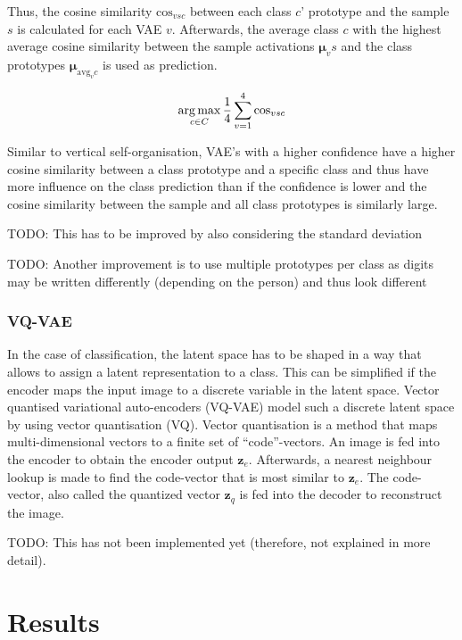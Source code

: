 Thus, the cosine similarity $\text{cos}_{vsc}$ between each class $c$' prototype and the sample $s$ is calculated for each VAE $v$.
Afterwards, the average class $c$ with the highest average cosine similarity between the sample activations $\boldsymbol{\mu}_vs$ and the class prototypes $\boldsymbol{\mu}_{\text{avg}_vc}$ is used as prediction.

\begin{equation}\eqlbl{hso_14}
		\argmax_{c \in C} \frac{1}{4} \sum_{v=1}^{4} \text{cos}_{vsc}
\end{equation}

Similar to vertical self-organisation, VAE's with a higher confidence have a higher cosine similarity between a class prototype and a specific class and thus have more influence on the class prediction than if the confidence is lower and the cosine similarity between the sample and all class prototypes is similarly large.

TODO: This has to be improved by also considering the standard deviation


TODO: Another improvement is to use multiple prototypes per class as digits may be written differently (depending on the person) and thus look different


\subsubsection{VQ-VAE}
In the case of classification, the latent space has to be shaped in a way that allows to assign a latent representation to a class.
This can be simplified if the encoder maps the input image to a discrete variable in the latent space.
Vector quantised variational auto-encoders (VQ-VAE)  model such a discrete latent space by using vector quantisation (VQ).
Vector quantisation is a method that maps multi-dimensional vectors to a finite set of ``code''-vectors.
An image is fed into the encoder to obtain the encoder output $\boldsymbol{z}_e$.
Afterwards, a nearest neighbour lookup is made to find the code-vector that is most similar to $\boldsymbol{z}_e$.
The code-vector, also called the quantized vector $\boldsymbol{z}_q$ is fed into the decoder to reconstruct the image.


TODO: This has not been implemented yet (therefore, not explained in more detail).








\section{Results}





